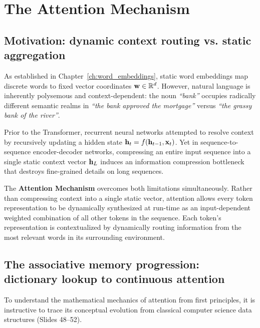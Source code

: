 \documentclass[../../main.tex]{subfiles}
\begin{document}
\clearpage
\section{The Attention Mechanism}
\label{sec:attention_mechanism_primitive}

\subsection{Motivation: dynamic context routing vs. static aggregation}
\label{subsec:why_attention_dynamic}

As established in Chapter~\ref{ch:word_embeddings}, static word embeddings map discrete words to fixed vector coordinates $\mathbf{w} \in \mathbb{R}^d$. However, natural language is inherently polysemous and context-dependent: the noun \emph{``bank''} occupies radically different semantic realms in \emph{``the bank approved the mortgage''} versus \emph{``the grassy bank of the river''}.

Prior to the Transformer, recurrent neural networks attempted to resolve context by recursively updating a hidden state $\mathbf{h}_t = f(\mathbf{h}_{t-1}, \mathbf{x}_t)$. Yet in sequence-to-sequence encoder-decoder networks, compressing an entire input sequence into a single static context vector $\mathbf{h}_L$ induces an information compression bottleneck that destroys fine-grained details on long sequences.

The \textbf{Attention Mechanism} overcomes both limitations simultaneously. Rather than compressing context into a single static vector, attention allows every token representation to be dynamically synthesized at run-time as an input-dependent weighted combination of all other tokens in the sequence. Each token's representation is contextualized by dynamically routing information from the most relevant words in its surrounding environment.

\subsection{The associative memory progression: dictionary lookup to continuous attention}
\label{subsec:associative_memory_progression}

To understand the mathematical mechanics of attention from first principles, it is instructive to trace its conceptual evolution from classical computer science data structures (Slides 48--52).
\end{document}
